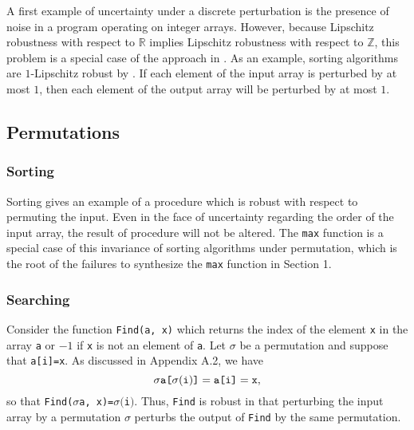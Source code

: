 \documentclass{llncs}
\DeclareMathOperator{\Perm}{Perm}
\DeclareMathOperator{\len}{length}
\begin{document}
  A first example of uncertainty under a discrete perturbation is the presence
  of noise in a program operating on integer arrays.  However, because Lipschitz
  robustness with respect to \(\mathbb{R}\) implies Lipschitz robustness with
  respect to \(\mathbb{Z}\), this problem is a special case of the approach in
  \cite{chaudhuri10,chaudhuri11}.  As an example, sorting algorithms are
  \(1\)-Lipschitz robust by \cite{chaudhuri10,chaudhuri11}.
  If each element of the input array is perturbed by at most
  \(1\), then each element of the output array will be perturbed by at most \(1\).

  \vspace{-0.1in}
  \subsection{Permutations}


    \subsubsection{Sorting}

      Sorting gives an example of a procedure which is robust with respect to permuting
      the input.  Even in the face of uncertainty regarding the order of the input
      array, the result of procedure will not be altered.  The \verb!max! function is
      a special case of this invariance of sorting algorithms under permutation, which
      is the root of the failures to synthesize the \verb!max!
      function in Section 1.

    \vspace{-0.1in}
    \subsubsection{Searching}

      Consider the function \verb!Find(a, x)! which returns the index of the element
      \verb!x! in the array \verb!a! or \(-1\) if \verb!x! is not an element of
      \verb!a!.  Let \(\sigma\) be a permutation and suppose that \verb!a[i]=x!.
      As discussed in Appendix A.2, we have
      \[
        \sigma\verb!a[!\sigma(\verb!i!)\verb!]! = \verb!a[i]! = \verb!x!,
      \] 
      so that \verb!Find(!\(\sigma\)\verb!a, x)=!\(\sigma(\)\verb!i!\()\).
      Thus, \verb!Find! is
      robust in that perturbing the input array by a permutation \(\sigma\) perturbs
      the output of \verb!Find! by the same permutation.%
\end{document}
